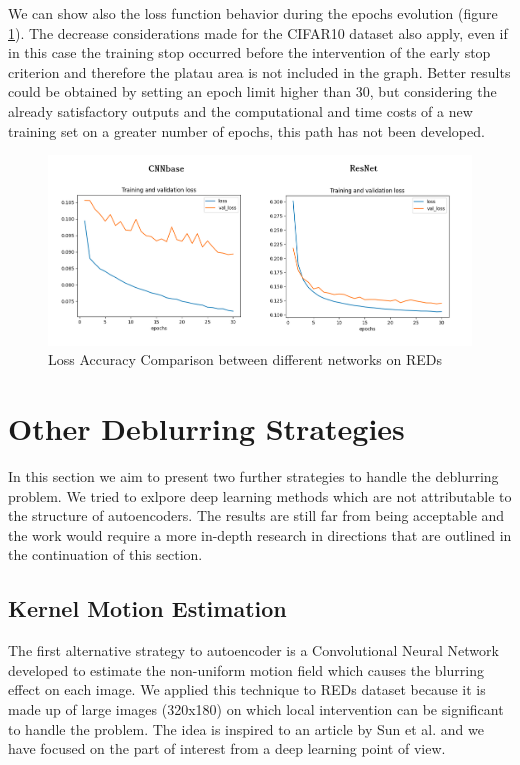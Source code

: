 \documentclass[12pt,a4paper]{article}
\begin{document}
We can show also the loss function behavior during the epochs evolution (figure \ref{Loss_accuracy_comparison_REDs}). The decrease considerations made for the CIFAR10 dataset also apply, even if in this case the training stop occurred before the intervention of the early stop criterion and therefore the platau area is not included in the graph. Better results could be obtained by setting an epoch limit higher than 30, but considering the already satisfactory outputs and the computational and time costs of a new training set on a greater number of epochs, this path has not been developed.

\begin{figure}[hptb]
\centering
\includegraphics[scale=0.4]{Loss_accuracy_comparison_REDs.png} 
\caption{Loss Accuracy Comparison between different networks on REDs}
\label{Loss_accuracy_comparison_REDs}
\end{figure}

\section{Other Deblurring Strategies}
In this section we aim to present two further strategies to handle the deblurring problem. We tried to exlpore deep learning methods which are not attributable to the structure of autoencoders. The results are still far from being acceptable and the work would require a more in-depth research in directions that are outlined in the continuation of this section.

\subsection{Kernel Motion Estimation}
The first alternative strategy to autoencoder is a Convolutional Neural Network developed to estimate the non-uniform motion field which causes the blurring effect on each image. We applied this technique to REDs dataset because it is made up of large images (320x180) on which local intervention can be significant to handle the problem. The idea is inspired to an article by Sun et al. \cite{S&Al} and we have focused on the part of interest from a deep learning point of view. 
\end{document}
